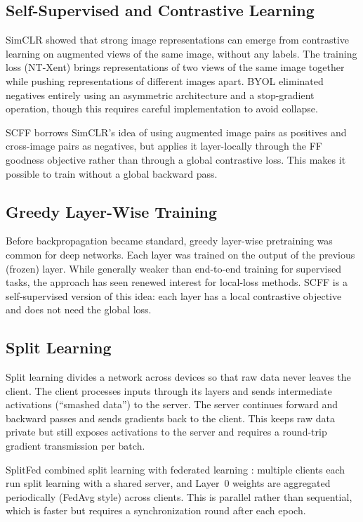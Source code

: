 \documentclass[12pt]{article}
\begin{document}
\subsection{Self-Supervised and Contrastive Learning}

SimCLR \citep{chen2020simclr} showed that strong image representations can emerge from
contrastive learning on augmented views of the same image, without any labels. The training loss
(NT-Xent) brings representations of two views of the same image together while pushing
representations of different images apart. BYOL \citep{grill2020byol} eliminated negatives
entirely using an asymmetric architecture and a stop-gradient operation, though this requires
careful implementation to avoid collapse.

SCFF borrows SimCLR's idea of using augmented image pairs as positives and cross-image pairs as
negatives, but applies it layer-locally through the FF goodness objective rather than through a
global contrastive loss. This makes it possible to train without a global backward pass.

\subsection{Greedy Layer-Wise Training}

Before backpropagation became standard, greedy layer-wise pretraining \citep{bengio2007greedy}
was common for deep networks. Each layer was trained on the output of the previous (frozen)
layer. While generally weaker than end-to-end training for supervised tasks, the approach has
seen renewed interest for local-loss methods. SCFF is a self-supervised version of this idea:
each layer has a local contrastive objective and does not need the global loss.

\subsection{Split Learning}

Split learning \citep{vepakomma2018split} divides a network across devices so that raw data
never leaves the client. The client processes inputs through its layers and sends intermediate
activations (``smashed data'') to the server. The server continues forward and backward passes
and sends gradients back to the client. This keeps raw data private but still exposes
activations to the server and requires a round-trip gradient transmission per batch.

SplitFed \citep{thapa2022splitfed} combined split learning with federated learning
\citep{mcmahan2017fedavg}: multiple clients each run split learning with a shared server, and
Layer~0 weights are aggregated periodically (FedAvg style) across clients. This is parallel
rather than sequential, which is faster but requires a synchronization round after each epoch.
\end{document}
